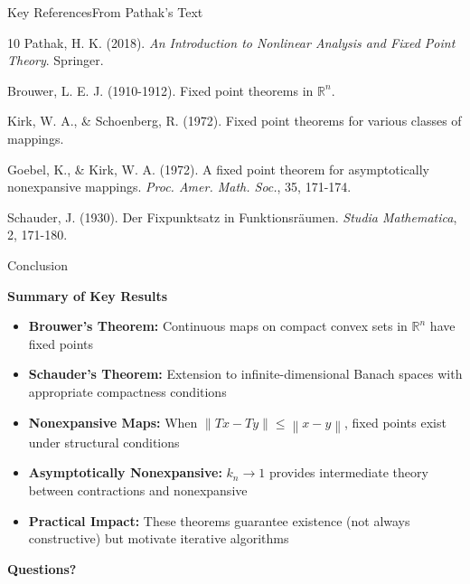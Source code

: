 \documentclass[aspectratio=169,10pt]{beamer}
\newcommand{\norm}[1]{\left\lVert#1\right\rVert}
\begin{document}
\begin{frame}{Key References}{From Pathak's Text}
    \small
    \begin{thebibliography}{10}
         Pathak, H. K. (2018). \textit{An Introduction to Nonlinear Analysis and Fixed Point Theory}. Springer.

         Brouwer, L. E. J. (1910-1912). Fixed point theorems in $\mathbb{R}^n$.

         Kirk, W. A., \& Schoenberg, R. (1972). Fixed point theorems for various classes of mappings.

         Goebel, K., \& Kirk, W. A. (1972). A fixed point theorem for asymptotically nonexpansive mappings. \textit{Proc. Amer. Math. Soc.}, 35, 171-174.

         Schauder, J. (1930). Der Fixpunktsatz in Funktionsräumen. \textit{Studia Mathematica}, 2, 171-180.
    \end{thebibliography}
\end{frame}

\begin{frame}{Conclusion}
    \begin{center}
        \Large
        \textbf{Summary of Key Results}
    \end{center}

    \vspace{0.5cm}

    \begin{itemize}
        \setlength{\itemsep}{0.3cm}

        \item \textbf{Brouwer's Theorem:} Continuous maps on compact convex sets in $\mathbb{R}^n$ have fixed points

        \item \textbf{Schauder's Theorem:} Extension to infinite-dimensional Banach spaces with appropriate compactness conditions

        \item \textbf{Nonexpansive Maps:} When $\norm{Tx-Ty} \leq \norm{x-y}$, fixed points exist under structural conditions

        \item \textbf{Asymptotically Nonexpansive:} $k_n \to 1$ provides intermediate theory between contractions and nonexpansive

        \item \textbf{Practical Impact:} These theorems guarantee existence (not always constructive) but motivate iterative algorithms

    \end{itemize}

    \vspace{0.8cm}

    \begin{center}
        \textbf{Questions?}
    \end{center}
\end{frame}
\end{document}
